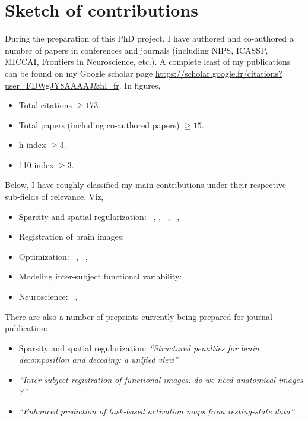 \section{Sketch of contributions}
\label{sec:contrib}
During the preparation of this PhD project, I have authored and co-authored a number of papers in conferences and journals (including NIPS, ICASSP, MICCAI,
Frontiers in Neuroscience, etc.).
A complete least of my publications can be found on my Google scholar page \url{https://scholar.google.fr/citations?user=FDWgJY8AAAAJ&hl=fr}. In figures,
\begin{shaded}
\begin{itemize}
\item Total citations $\ge 173$.
  \item Total papers (including co-authored papers) $\ge 15$.
  \item h index $\ge 3$.
  \item 110 index $ \ge 3$.
  \end{itemize}
\end{shaded}  
Below, I  have roughly classified my main contributions under their respective sub-fields of relevance. Viz,
\begin{shaded}
\begin{itemize}
  \item{Sparsity and spatial regularization:}
     ~\citep{dohmatob2014benchmarking},  \citep{dohmatob2015speeding},
     ~\citep{abrahamregion},  ~\citep{eickenberg2015total},
     ~\citep{pelle2016multivariate}
  \item{Registration of brain images:}
    ~\citep{dohmatob2016epi2epi}
  \item{Optimization:}
     ~\citep{dohmatob2015local},  ~\citep{varoquaux2015faasta},  ~\citep{dohmatob2015simple}
  \item Modeling inter-subject functional variability:
     ~\citep{dohmatob2016}
  \item{Neuroscience:}
     ~\citep{rahim2015integrating},  ~\citep{thirion2014fmri}
\end{itemize}
\end{shaded}

There are also a number of preprints currently being prepared for journal publication:

\begin{shaded}
\begin{itemize}
  \item{Sparsity and spatial regularization:}
     \textit{``Structured penalties for brain decomposition and decoding: a unified view''}
   \item \textit{``Inter-subject registration of functional images: do we need anatomical images ?''}
   \item \textit{``Enhanced prediction of task-based activation maps
     from resting-state data''}
\end{itemize}
\end{shaded}


